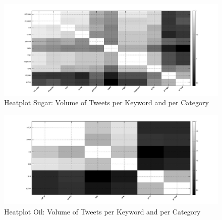 \begin{figure}[H]
        \centering
         \includegraphics[width=1\textwidth ]{img/anal/sugar_black}
              
        \caption{Heatplot Sugar: Volume of Tweets per Keyword and per Category}
        \label{fig:sugar_heat}
\end{figure}

\begin{figure}[H]
        \centering
         \includegraphics[width=1\textwidth ]{img/anal/black_oil}
              
        \caption{Heatplot Oil: Volume of Tweets per Keyword and per Category}
        \label{fig:oil_heat}
\end{figure}






